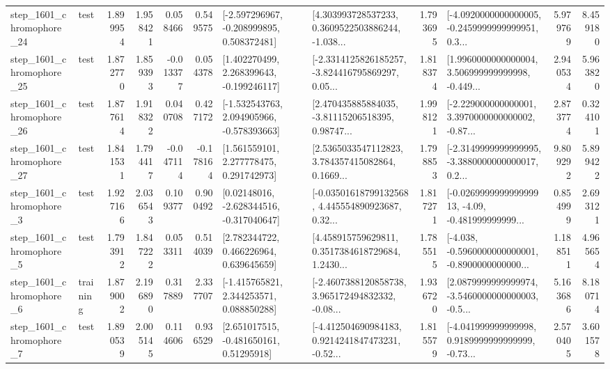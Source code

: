\begin{tabular}{llrrrrllrlrr}
 step\_1601\_chromophore\_24 &      test &      1.899954 &    1.958421 &      0.058466 &  0.549575 &   [-2.597296967, -0.208999895, 0.508372481] &  [4.303993728537233, 0.3609522503886244, -1.038... &       1.793695 &  [-4.0920000000000005, -0.2459999999999951, 0.3... &            5.979769 &          8.459180 \\
 step\_1601\_chromophore\_25 &      test &      1.872770 &    1.859393 &     -0.013377 &  0.054378 &    [1.402270499, 2.268399643, -0.199246117] &  [-2.3314125826185257, -3.824416795869297, 0.05... &       1.818374 &  [1.9960000000000004, 3.506999999999998, -0.449... &            2.940534 &          5.963820 \\
 step\_1601\_chromophore\_26 &      test &      1.877614 &    1.918322 &      0.040708 &  0.427172 &   [-1.532543763, 2.094905966, -0.578393663] &  [2.470435885884035, -3.81115206518395, 0.98747... &       1.998121 &  [-2.229000000000001, 3.3970000000000002, -0.87... &            2.873774 &          0.324101 \\
 step\_1601\_chromophore\_27 &      test &      1.841531 &    1.794417 &     -0.047114 & -0.178164 &     [1.561559101, 2.277778475, 0.291742973] &  [2.5365033547112823, 3.784357415082864, 0.1669... &       1.798853 &  [-2.3149999999999995, -3.3880000000000017, 0.2... &            9.809292 &          5.899422 \\
  step\_1601\_chromophore\_3 &      test &      1.927166 &    2.036543 &      0.109377 &  0.900492 &    [0.02148016, -2.628344516, -0.317040647] &  [-0.03501618799132568, 4.445554890923687, 0.32... &       1.817271 &  [-0.026999999999999913, -4.09, -0.481999999999... &            0.854999 &          2.693121 \\
  step\_1601\_chromophore\_5 &      test &      1.793912 &    1.847222 &      0.053311 &  0.514039 &     [2.782344722, 0.466226964, 0.639645659] &  [4.458915759629811, 0.3517384618729684, 1.2430... &       1.785515 &  [-4.038, -0.5960000000000001, -0.8900000000000... &            1.188511 &          4.965654 \\
  step\_1601\_chromophore\_6 &  training &      1.879002 &    2.196890 &      0.317889 &  2.337707 &    [-1.415765821, 2.344253571, 0.088850288] &  [-2.4607388120858738, 3.965172494832332, -0.08... &       1.936720 &  [2.0879999999999974, -3.5460000000000003, -0.5... &            5.163686 &          8.180714 \\
  step\_1601\_chromophore\_7 &      test &      1.890539 &    2.005145 &      0.114606 &  0.936529 &     [2.651017515, -0.481650161, 0.51295918] &  [-4.412504690984183, 0.9214241847473231, -0.52... &       1.815579 &  [-4.041999999999998, 0.9189999999999999, -0.73... &            2.570405 &          3.601578 \\

\end{tabular}
